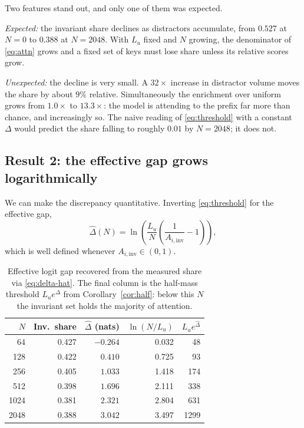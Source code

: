 \documentclass[11pt,a4paper]{article}
\theoremstyle{plain}
\theoremstyle{definition}
\theoremstyle{remark}
\newcommand{\Ainv}{A_{i,\mathrm{inv}}}
\begin{document}
Two features stand out, and only one of them was expected.

\emph{Expected:} the invariant share declines as distractors accumulate, from
$0.527$ at $N=0$ to $0.388$ at $N=2048$. With $L_u$ fixed and $N$ growing, the
denominator of \eqref{eq:attn} grows and a fixed set of keys must lose share
unless its relative scores grow.

\emph{Unexpected:} the decline is very small. A $32\times$ increase in
distractor volume moves the share by about $9\%$ relative. Simultaneously the
enrichment over uniform grows from $1.0\times$ to $13.3\times$: the model is
attending to the prefix far more than chance, and increasingly so. The naive
reading of \eqref{eq:threshold} with a constant $\Delta$ would predict the share
falling to roughly $0.01$ by $N=2048$; it does not.

\subsection{Result 2: the effective gap grows logarithmically}

We can make the discrepancy quantitative. Inverting
\eqref{eq:threshold} for the effective gap,
\begin{equation}
  \hat{\Delta}(N)
  = \ln\!\left(\frac{L_u}{N}\left(\frac{1}{\Ainv} - 1\right)\right),
  \label{eq:delta-hat}
\end{equation}
which is well defined whenever $\Ainv \in (0,1)$.

\begin{table}[ht]
\centering
\small
\begin{tabular}{rrrrr}
\toprule
\textbf{$N$} & \textbf{Inv.\ share} & \textbf{$\hat{\Delta}$ (nats)} & \textbf{$\ln(N/L_u)$} & \textbf{$L_u e^{\hat{\Delta}}$} \\
\midrule
64   & 0.427 & $-0.264$ & 0.032 & 48 \\
128  & 0.422 & $0.410$  & 0.725 & 93 \\
256  & 0.405 & $1.033$  & 1.418 & 174 \\
512  & 0.398 & $1.696$  & 2.111 & 338 \\
1024 & 0.381 & $2.321$  & 2.804 & 631 \\
2048 & 0.388 & $3.042$  & 3.497 & 1299 \\
\bottomrule
\end{tabular}
\caption{Effective logit gap recovered from the measured share via
\eqref{eq:delta-hat}. The final column is the half-mass threshold
$L_u e^{\Delta}$ from Corollary~\ref{cor:half}: below this $N$ the invariant set
holds the majority of attention.}
\label{tab:gap}
\end{table}
\end{document}
